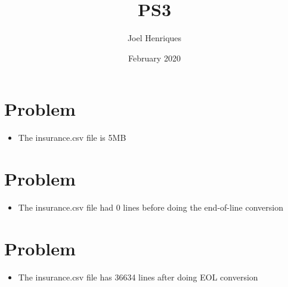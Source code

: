 \documentclass{article}
\title{PS3}
\author{Joel Henriques}
\date{February 2020}
\begin{document}
\maketitle

\section{Problem}
\begin{itemize}
    \item The insurance.csv file is 5MB
\end{itemize}

\section{Problem}
\begin{itemize} 
    \item The insurance.csv file had 0 lines before doing the end-of-line conversion
\end{itemize}

\section{Problem}
\begin{itemize}
    \item The insurance.csv file has 36634 lines after doing EOL conversion
\end{itemize}
\end{document}
